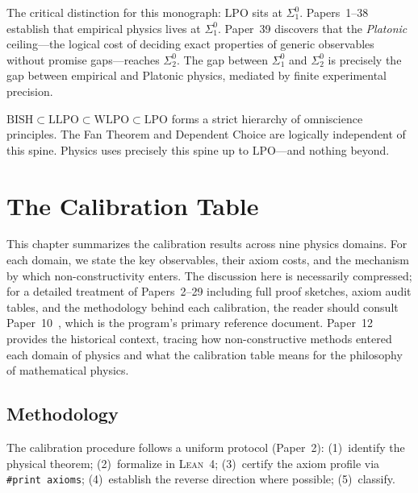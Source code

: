 \documentclass[11pt,a4paper]{report}
\theoremstyle{plain}
\theoremstyle{definition}
\theoremstyle{remark}
\newcommand{\BISH}{\mathrm{BISH}}
\newcommand{\LLPO}{\mathrm{LLPO}}
\newcommand{\WLPO}{\mathrm{WLPO}}
\newcommand{\LPO}{\mathrm{LPO}}
\newcommand{\Lean}{\textsc{Lean~4}}
\begin{document}
The critical distinction for this monograph: $\LPO$ sits at $\Sigma^0_1$. Papers~1--38 establish that empirical physics lives at $\Sigma^0_1$. Paper~39 discovers that the \emph{Platonic} ceiling---the logical cost of deciding exact properties of generic observables without promise gaps---reaches $\Sigma^0_2$. The gap between $\Sigma^0_1$ and $\Sigma^0_2$ is precisely the gap between empirical and Platonic physics, mediated by finite experimental precision.

\begin{chapterbox}
$\BISH \subset \LLPO \subset \WLPO \subset \LPO$ forms a strict hierarchy of omniscience principles. The Fan Theorem and Dependent Choice are logically independent of this spine. Physics uses precisely this spine up to $\LPO$---and nothing beyond.
\end{chapterbox}

\chapter{The Calibration Table}

This chapter summarizes the calibration results across nine physics domains.  For each domain, we state the key observables, their axiom costs, and the mechanism by which non-constructivity enters.  The discussion here is necessarily compressed; for a detailed treatment of Papers~2--29 including full proof sketches, axiom audit tables, and the methodology behind each calibration, the reader should consult Paper~10~\cite{Lee2026P10}, which is the program's primary reference document.  Paper~12~\cite{Lee2026P12} provides the historical context, tracing how non-constructive methods entered each domain of physics and what the calibration table means for the philosophy of mathematical physics.

\section{Methodology}

The calibration procedure follows a uniform protocol (Paper~2): (1)~identify the physical theorem; (2)~formalize in \Lean; (3)~certify the axiom profile via \texttt{\#print axioms}; (4)~establish the reverse direction where possible; (5)~classify.
\end{document}
